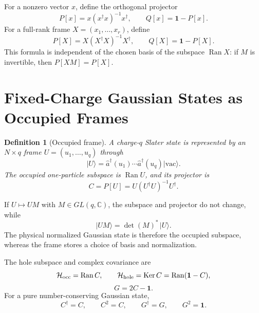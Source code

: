 \documentclass[aps,prb,onecolumn,nofootinbib,superscriptaddress]{revtex4-2}
\newtheorem{definition}{Definition}
\newcommand{\cH}{\mathcal H}
\newcommand{\Id}{\mathbf{1}}
\newcommand{\vac}{\mathrm{vac}}
\newcommand{\Ran}{\operatorname{Ran}}
\newcommand{\Ker}{\operatorname{Ker}}
\newcommand{\ket}[1]{\lvert #1\rangle}
\newcommand{\ahat}{\hat a}
\begin{document}
For a nonzero vector \(x\), define the orthogonal projector
\begin{equation}
  P[x]=x(x^\dagger x)^{-1}x^\dagger,\qquad Q[x]=\Id-P[x].
\end{equation}
For a full-rank frame \(X=(x_1,\ldots,x_r)\), define
\begin{equation}
  P[X]=X(X^\dagger X)^{-1}X^\dagger,\qquad Q[X]=\Id-P[X].
  \label{eq:frame-projector}
\end{equation}
This formula is independent of the chosen basis of the subspace
\(\Ran X\): if \(M\) is invertible, then \(P[XM]=P[X]\).

\section{Fixed-Charge Gaussian States as Occupied Frames}

\begin{definition}[Occupied frame]
A charge-\(q\) Slater state is represented by an \(N\times q\) frame
\(U=(u_1,\ldots,u_q)\) through
\begin{equation}
  \ket{U}
  =
  \ahat^\dagger(u_1)\cdots \ahat^\dagger(u_q)\ket{\vac}.
  \label{eq:slater-frame}
\end{equation}
The occupied one-particle subspace is \(\Ran U\), and its projector is
\begin{equation}
  C=P[U]=U(U^\dagger U)^{-1}U^\dagger .
  \label{eq:occupied-projector}
\end{equation}
\end{definition}

If \(U\mapsto UM\) with \(M\in GL(q,\mathbb C)\), the subspace and projector
do not change, while
\begin{equation}
  \ket{UM}=\det(M)^*\,\ket{U}.
\end{equation}
The physical normalized Gaussian state is therefore the occupied subspace,
whereas the frame stores a choice of basis and normalization.

The hole subspace and complex covariance are
\begin{equation}
  \cH_{\rm occ}=\Ran C,\qquad
  \cH_{\rm hole}=\Ker C=\Ran(\Id-C),
\end{equation}
\begin{equation}
  G=2C-\Id .
  \label{eq:complex-covariance}
\end{equation}
For a pure number-conserving Gaussian state,
\begin{equation}
  C^\dagger=C,\qquad C^2=C,\qquad G^\dagger=G,\qquad G^2=\Id .
\end{equation}
\end{document}
